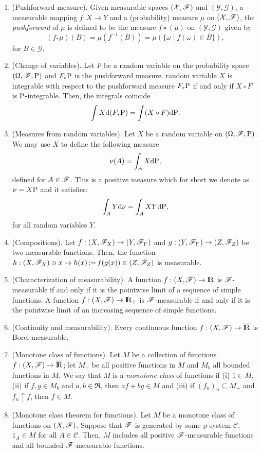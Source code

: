 \documentclass[a4paper,10pt]{article}
\begin{document}
\begin{enumerate}
 \item (Pushforward measure). Given measurable spaces $(\mathcal{X},\mathscr{F})$ and $(\mathcal{Y}, \mathcal{G})$, 
 a measurable mapping $f: X \to Y$ and a (probability) measure $\mu$ on $(\mathcal{X},\mathscr{F})$, the \textit{pushforward} of $\mu$
 is defined to be the measure $f∗(μ)$ on $(\mathcal{Y}, \mathcal{G})$ given by
 \[
  (f_*\mu)(B) = \mu(f^{-1}(B)) = \mu(\{\omega\mid f(\omega)\in B\}),
 \]
 for $B\in\mathcal{G}$.
 \item (Change of variables). Let $F$ be a random variable on the probability space $(\Omega,\mathscr{F},\mathrm{P})$ and $F_*\mathrm{P}$ 
 is the pushforward measure. random variable $X$ is integrable with respect to the pushforward measure $F_*\mathrm{P}$
 if and only if $X\circ F$ is $\mathrm{P}$-integrable. Then, the integrals coincide
 \[
  \int X \mathrm{d}(F_*\mathrm{P}) = \int (X\circ F) \mathrm{d} \mathrm{P}.
 \]
 \item (Measures from random variables). Let $X$ be a random variable on $(\Omega,\mathscr{F},\mathrm{P})$. 
       We may use $X$ to define the following measure
       \[
        \nu(A) = \int_A X\mathrm{d} \mathrm{P},
       \]
       defined for $A\in\mathscr{F}$. This is a positive measure which for short we denote as $\nu=X\mathrm{P}$
       and it satisfies:
       \[
        \int_A Y\mathrm{d} \nu = \int_A XY\mathrm{d} \mathrm{P},
       \]
       for all random variables $Y$.
       
 \item (Compositions). Let $f:(X,\mathscr{F}_X)\to (Y, \mathscr{F}_Y)$ and $g:(Y,\mathscr{F}_Y)\to (Z,\mathscr{F}_Z)$ be two measurable functions. 
       Then, the function $h:(X,\mathscr{F}_X)\ni x\mapsto h(x) {}\mathop{\mathrel{:}=}{} f(g(x)) \in (Z,\mathscr{F}_Z)$ is measurable. 
       
 \item (Characterization of measurability). A function $f:(X,\F)\to\Re$ is $\mathscr{F}$-measurable if and only if 
       it is the pointwise limit of a sequence of simple functions. A function $f:(X,\F)\to\Re_+$ is 
       $\mathscr{F}$-measurable if and only if  it is the pointwise limit of an increasing sequence of simple functions. 
       
 \item (Continuity and measurability). Every continuous function $f:(X,\F)\to\barre$ is Borel-measurable. 
  
 \item (Monotone class of functions). Let $M$ be a collection of functions $f:(X,\F)\to\barre$; let $M_+$
       be all positive functions in $M$ and $M_b$ all bounded functions in $M$. We say that $M$ is a \textit{monotone class}
       of functions if (i) $1\in M$, (ii) if $f,g\in M_b$ and $a,b\in \Re$, then $af+bg\in M$ and (iii)
       if $(f_n)_n\subseteq M_+$ and $f_n \uparrow f$, then $f\in M$.
       
 \item (Monotone class theorem for functions). Let $M$ be a monotone class of functions on $(X,\mathscr{F})$. Suppose 
       that $\mathscr{F}$ is generated by some p-system $\mathcal{C}$, $1_A \in M$ for all $A\in\mathcal{C}$.
       Then, $M$ includes all positive $\mathscr{F}$-measurable functions and all bounded $\mathscr{F}$-measurable functions. 
\end{enumerate}
\end{document}
